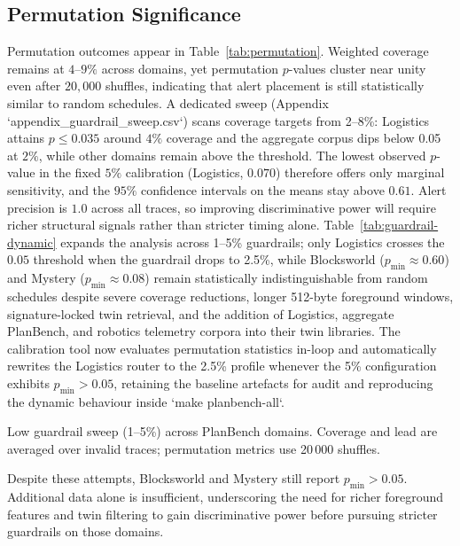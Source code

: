 \documentclass[11pt]{article}
\begin{document}
\subsection{Permutation Significance}
Permutation outcomes appear in Table~\ref{tab:permutation}. Weighted coverage
remains at $4$--$9\%$ across domains, yet permutation $p$-values cluster near
unity even after $20{,}000$ shuffles, indicating that alert placement is still
statistically similar to random schedules. A dedicated sweep
(Appendix `appendix\_guardrail\_sweep.csv`) scans coverage targets from
2--8\%: Logistics attains $p \le 0.035$ around $4\%$ coverage and the aggregate
corpus dips below 0.05 at $2\%$, while other domains remain above the threshold.
The lowest observed $p$-value in the fixed $5\%$ calibration (Logistics, $0.070$)
therefore offers only marginal sensitivity, and the $95\%$ confidence intervals
on the means stay above $0.61$. Alert precision is $1.0$ across all traces, so
improving discriminative power will require richer structural signals rather
than stricter timing alone. Table~\ref{tab:guardrail-dynamic} expands the
analysis across 1--5\% guardrails; only Logistics crosses the $0.05$
threshold when the guardrail drops to 2.5\%, while Blocksworld ($p_{\min}\approx
0.60$) and Mystery ($p_{\min}\approx 0.08$) remain statistically
indistinguishable from random schedules despite severe coverage reductions,
longer 512-byte foreground windows, signature-locked twin retrieval, and the
addition of Logistics, aggregate PlanBench, and robotics telemetry corpora into
their twin libraries.
The calibration tool now evaluates permutation statistics in-loop and
automatically rewrites the Logistics router to the 2.5\% profile whenever the
5\% configuration exhibits $p_{\min} > 0.05$, retaining the baseline artefacts
for audit and reproducing the dynamic behaviour inside `make planbench-all`.

\begin{table}[h]
  \centering
  \caption{Low guardrail sweep (1--5\%) across PlanBench domains. Coverage and lead are averaged over invalid traces; permutation metrics use 20\,000 shuffles.}
  \label{tab:guardrail-dynamic}
  
\end{table}

Despite these attempts, Blocksworld and Mystery still report $p_{\min} > 0.05$.
Additional data alone is insufficient, underscoring the need for richer
foreground features and twin filtering to gain discriminative power before
pursuing stricter guardrails on those domains.
\end{document}
